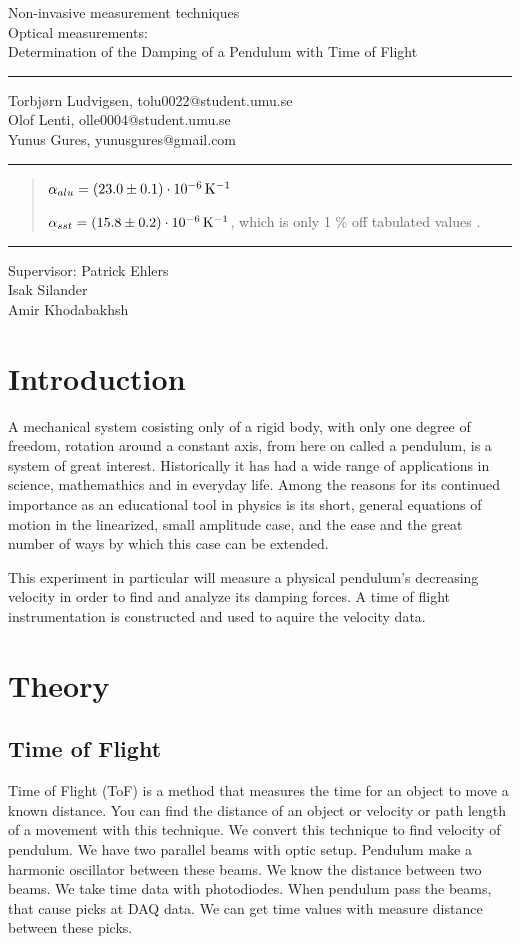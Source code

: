 ﻿\documentclass[11pt, a4paper]{article}
\date{\todayswe}
\makeatletter
\def\contacts{Torbjørn Ludvigsen, tolu0022@student.umu.se\\Olof Lenti, olle0004@student.umu.se\\
Yunus Gures, yunusgures@gmail.com}
\def\course{Non-invasive measurement techniques}
\def\lab{Optical measurements:\\Determination of the Damping of a Pendulum with Time of Flight}
\def\supervisors{Patrick Ehlers\\Isak Silander\\ Amir Khodabakhsh}
\makeatother
\begin{document}
\pagestyle{fancy}
\begin{titlepage}
	\begin{center}
		\course\\
		\Large{\lab}\vspace{2mm}
		\hrule\vspace{2mm}
		\tiny{\contacts}\vspace{2mm}
		\hrule
	\end{center}
	\vspace{4mm}

	\begin{abstract}

  $\alpha_{alu} =\unit[(23.0 \pm 0.1)\cdot10^{-6}]{K^{-1}}$ 

  $\alpha_{sst} = \unit[(15.8 \pm 0.2)\cdot10^{-6}]{K^{-1}}$, 
    which is only 1 \% off tabulated values \cite{ph, thex}.

	\end{abstract}
	\vfill
	\hrule\vspace{2mm}
	\centering
		\tiny{Supervisor: \supervisors}
\end{titlepage}

\pagestyle{plain}
\vspace{2cm}
\section{Introduction}
A mechanical system cosisting only of a rigid body, with only one degree of 
freedom, rotation around a constant axis, from here on called a pendulum, is 
a system of great interest. Historically it has had a wide range of
applications in science, mathemathics and in everyday life. Among the reasons for
its continued importance as an educational tool in physics is its short, general 
equations of
motion in the linearized, small amplitude case, and the ease and the great number 
of ways by which this case can be extended.

This experiment in particular will measure a physical pendulum's decreasing velocity
in order to find and analyze its damping forces. A time of flight instrumentation
is constructed and used to aquire the velocity data.

\section{Theory}
\subsection{Time of Flight}
Time of Flight (ToF) is a method that measures the time for an object to move a known distance.
You can find the distance of an object or velocity or path length of a movement with this technique.
We convert this technique to find velocity of pendulum. We have two parallel beams 
with optic setup. Pendulum make a harmonic oscillator between these beams. We know the 
distance between two beams. We take time data with photodiodes. When pendulum pass the 
beams, that cause picks at DAQ data. We can get time values with measure distance between 
these picks.
\end{document}
